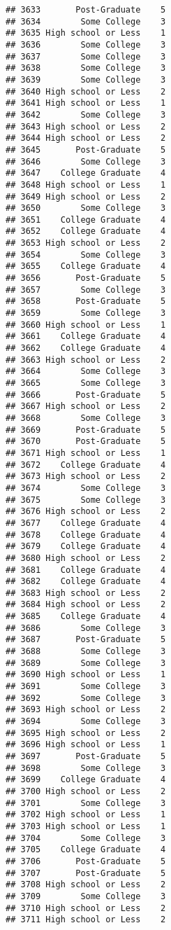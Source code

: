 \documentclass[
]{article}
\begin{document}
\begin{verbatim}
## 3633       Post-Graduate    5
## 3634        Some College    3
## 3635 High school or Less    1
## 3636        Some College    3
## 3637        Some College    3
## 3638        Some College    3
## 3639        Some College    3
## 3640 High school or Less    2
## 3641 High school or Less    1
## 3642        Some College    3
## 3643 High school or Less    2
## 3644 High school or Less    2
## 3645       Post-Graduate    5
## 3646        Some College    3
## 3647    College Graduate    4
## 3648 High school or Less    1
## 3649 High school or Less    2
## 3650        Some College    3
## 3651    College Graduate    4
## 3652    College Graduate    4
## 3653 High school or Less    2
## 3654        Some College    3
## 3655    College Graduate    4
## 3656       Post-Graduate    5
## 3657        Some College    3
## 3658       Post-Graduate    5
## 3659        Some College    3
## 3660 High school or Less    1
## 3661    College Graduate    4
## 3662    College Graduate    4
## 3663 High school or Less    2
## 3664        Some College    3
## 3665        Some College    3
## 3666       Post-Graduate    5
## 3667 High school or Less    2
## 3668        Some College    3
## 3669       Post-Graduate    5
## 3670       Post-Graduate    5
## 3671 High school or Less    1
## 3672    College Graduate    4
## 3673 High school or Less    2
## 3674        Some College    3
## 3675        Some College    3
## 3676 High school or Less    2
## 3677    College Graduate    4
## 3678    College Graduate    4
## 3679    College Graduate    4
## 3680 High school or Less    2
## 3681    College Graduate    4
## 3682    College Graduate    4
## 3683 High school or Less    2
## 3684 High school or Less    2
## 3685    College Graduate    4
## 3686        Some College    3
## 3687       Post-Graduate    5
## 3688        Some College    3
## 3689        Some College    3
## 3690 High school or Less    1
## 3691        Some College    3
## 3692        Some College    3
## 3693 High school or Less    2
## 3694        Some College    3
## 3695 High school or Less    2
## 3696 High school or Less    1
## 3697       Post-Graduate    5
## 3698        Some College    3
## 3699    College Graduate    4
## 3700 High school or Less    2
## 3701        Some College    3
## 3702 High school or Less    1
## 3703 High school or Less    1
## 3704        Some College    3
## 3705    College Graduate    4
## 3706       Post-Graduate    5
## 3707       Post-Graduate    5
## 3708 High school or Less    2
## 3709        Some College    3
## 3710 High school or Less    2
## 3711 High school or Less    2

\end{verbatim}
\end{document}
